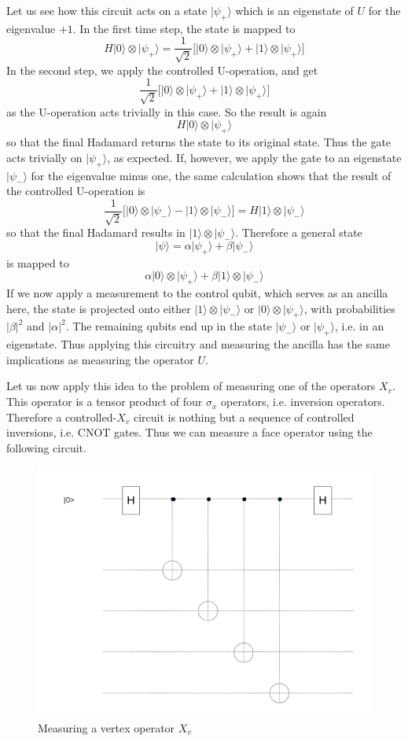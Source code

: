 \documentclass[a4paper, draft]{article}
\theoremstyle{own}
\theoremstyle{remark}
\begin{document}
Let us see how this circuit acts on a state $|\psi_+ \rangle$ which is an eigenstate of $U$ for the eigenvalue $+1$. In the first time step, the state is mapped to
$$
H|0 \rangle \otimes | \psi_+ \rangle = \frac{1}{\sqrt{2}} \big[ |0 \rangle \otimes | \psi_+ \rangle + | 1 \rangle \otimes | \psi_+ \rangle \big]
$$
In the second step, we apply the controlled U-operation, and get
$$
\frac{1}{\sqrt{2}} \big[ |0 \rangle \otimes | \psi_+ \rangle + | 1 \rangle \otimes | \psi_+ \rangle \big]
$$
as the U-operation acts trivially in this case. So the result is again
$$
H|0 \rangle \otimes | \psi_+ \rangle
$$
so that the final Hadamard returns the state to its original state. Thus the gate acts trivially on $|\psi_+ \rangle$, as expected. If, however, we apply the gate to an eigenstate $|\psi_- \rangle$ for the eigenvalue minus one, the same calculation shows that the result of the controlled U-operation is
$$
\frac{1}{\sqrt{2}} \big[ |0 \rangle \otimes | \psi_- \rangle - | 1 \rangle \otimes | \psi_- \rangle \big] = H|1 \rangle \otimes |\psi_- \rangle
$$
so that the final Hadamard results in $|1 \rangle \otimes |\psi_- \rangle$. Therefore a general state
$$
|\psi \rangle = \alpha |\psi_+ \rangle + \beta |\psi_- \rangle
$$
is mapped to
$$
\alpha |0 \rangle \otimes |\psi_+\rangle + \beta |1 \rangle \otimes |\psi_- \rangle
$$
If we now apply a measurement to the control qubit, which serves as an ancilla here, the state is projected onto either $|1 \rangle \otimes |\psi_- \rangle$ or $|0 \rangle \otimes |\psi_+ \rangle$, with probabilities $|\beta|^2$ and $|\alpha|^2$. The remaining qubits end up in the state $|\psi_-\rangle$ or $|\psi_+ \rangle$, i.e. in an eigenstate. Thus applying this circuitry and measuring the ancilla has the same implications as measuring the operator $U$.

Let us now apply this idea to the problem of measuring one of the operators $X_v$. This operator is a tensor product of four $\sigma_x$ operators, i.e. inversion operators. Therefore a controlled-$X_v$ circuit is nothing but a sequence of controlled inversions, i.e. CNOT gates. Thus we can measure a face operator using the following circuit.

\begin{figure}
\centering
\includegraphics[width=0.7\linewidth]{images/MeasuringXfI}
\caption{Measuring a vertex operator $X_v$}
\label{fig:MeasuringXfI}
\end{figure}
\end{document}
